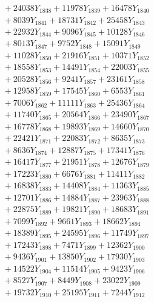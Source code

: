\documentclass[a4paper,10pt]{article}
\begin{document}
{\begin{align}
&\;  + 24038 Y_{1838} + 11978 Y_{1839} + 16478 Y_{1840} \\[0.3ex]
&\;  + 8039 Y_{1841} + 18731 Y_{1842} + 25458 Y_{1843} \\[0.3ex]
&\;  + 22932 Y_{1844} + 9096 Y_{1845} + 10128 Y_{1846} \\[0.3ex]
&\;  + 8013 Y_{1847} + 9752 Y_{1848} + 15091 Y_{1849} \\[0.3ex]
&\;  + 11028 Y_{1850} + 21916 Y_{1851} + 10371 Y_{1852} \\[0.3ex]
&\;  + 18558 Y_{1853} + 14491 Y_{1854} + 22003 Y_{1855} \\[0.3ex]
&\;  + 20528 Y_{1856} + 9241 Y_{1857} + 23161 Y_{1858} \\[0.5ex]\allowbreak
&\;  + 12958 Y_{1859} + 17545 Y_{1860} + 6553 Y_{1861} \\[0.3ex]
&\;  + 7006 Y_{1862} + 11111 Y_{1863} + 25436 Y_{1864} \\[0.3ex]
&\;  + 11740 Y_{1865} + 20564 Y_{1866} + 23490 Y_{1867} \\[0.3ex]
&\;  + 16778 Y_{1868} + 19893 Y_{1869} + 14660 Y_{1870} \\[0.3ex]
&\;  + 22421 Y_{1871} + 22083 Y_{1872} + 8635 Y_{1873} \\[0.3ex]
&\;  + 8636 Y_{1874} + 12887 Y_{1875} + 17341 Y_{1876} \\[0.3ex]
&\;  + 16417 Y_{1877} + 21951 Y_{1878} + 12676 Y_{1879} \\[0.3ex]
&\;  + 17223 Y_{1880} + 6676 Y_{1881} + 11411 Y_{1882} \\[0.3ex]
&\;  + 16838 Y_{1883} + 14408 Y_{1884} + 11363 Y_{1885} \\[0.3ex]
&\;  + 12701 Y_{1886} + 14884 Y_{1887} + 23963 Y_{1888} \\[0.5ex]\allowbreak
&\;  + 22875 Y_{1889} + 19821 Y_{1890} + 18683 Y_{1891} \\[0.3ex]
&\;  + 7099 Y_{1892} + 9661 Y_{1893} + 18662 Y_{1894} \\[0.3ex]
&\;  + 18389 Y_{1895} + 24595 Y_{1896} + 11749 Y_{1897} \\[0.3ex]
&\;  + 17243 Y_{1898} + 7471 Y_{1899} + 12362 Y_{1900} \\[0.3ex]
&\;  + 9436 Y_{1901} + 13850 Y_{1902} + 17930 Y_{1903} \\[0.3ex]
&\;  + 14522 Y_{1904} + 11514 Y_{1905} + 9423 Y_{1906} \\[0.3ex]
&\;  + 8527 Y_{1907} + 8449 Y_{1908} + 23022 Y_{1909} \\[0.3ex]
&\;  + 19732 Y_{1910} + 25195 Y_{1911} + 7244 Y_{1912} \\[0.3ex]

\end{align}}
\end{document}

